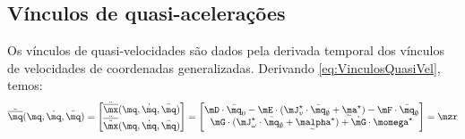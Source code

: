 \documentclass[]{politex}
\begin{document}
\subsection{Vínculos de quasi-acelerações} 
Os vínculos de quasi-velocidades são dados pela derivada temporal dos vínculos de velocidades  de coordenadas generalizadas. Derivando \eqref{eq:VinculosQuasiVel}, temos:
\begin{equation} \label{eq:VinculosQuasiAce}
\ddot{\overline{\mq}}(\mq,\dot{\mq},\ddot{\mq}) =
\begin{bmatrix}
\ddot{\overline{\mx}}(\mq,\dot{\mq},\ddot{\mq}) \\
\ddot{\overline{\breve{\mx}}}(\mq,\dot{\mq},\ddot{\mq})
\end{bmatrix}
= 
\begin{bmatrix}
\mD \cdot \ddot{\mq}_0 - \mE \cdot (\mJ_v^\star \cdot \ddot{\mq}_\emptyset + \underaccent{\sim}{\ma}^\star)  - \mF \cdot \ddot{\mq}_\emptyset \\
\mG \cdot ( \mJ_\omega^\star \cdot \ddot{\mq}_\emptyset + \underaccent{\sim}{ \malpha }^\star ) + \dot{\mG} \cdot  \momega^\star
\end{bmatrix}
=
\mzr
\end{equation}
\end{document}
